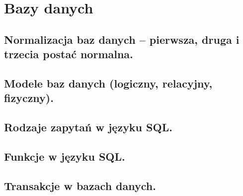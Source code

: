 \chapter{Bazy danych}
\section{Normalizacja baz danych – pierwsza, druga i trzecia postać normalna.}
\section{Modele baz danych (logiczny, relacyjny, fizyczny).}
\section{Rodzaje zapytań w języku SQL. }
\section{Funkcje w języku SQL.}
\section{Transakcje w bazach danych. }
